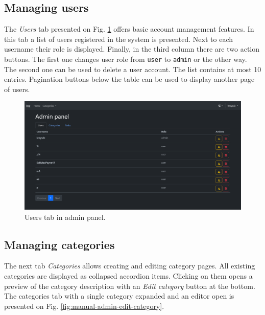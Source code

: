 \subsection{Managing users}

The \textit{Users} tab presented on Fig. \ref{fig:manual-admin-users} offers basic account management features. In this tab a list of users registered in the system is presented. Next to each username their role is displayed. Finally, in the third column there are two action buttons. The first one changes user role from \texttt{user} to \texttt{admin} or the other way. The second one can be used to delete a user account. The list contains at most 10 entries. Pagination buttons below the table can be used to display another page of users.

\begin{figure}
    \centering
    \includegraphics[width=\textwidth]{img/manual-admin-users.png}
    \caption{Users tab in admin panel.}
    \label{fig:manual-admin-users}
\end{figure}

\subsection{Managing categories}
\label{ssec:managing-categories}

The next tab \textit{Categories} allows creating and editing category pages. All existing categories are displayed as collapsed accordion items. Clicking on them opens a preview of the category description with an \textit{Edit category} button at the bottom. The categories tab with a single category expanded and an editor open is presented on Fig. \ref{fig:manual-admin-edit-category}.

